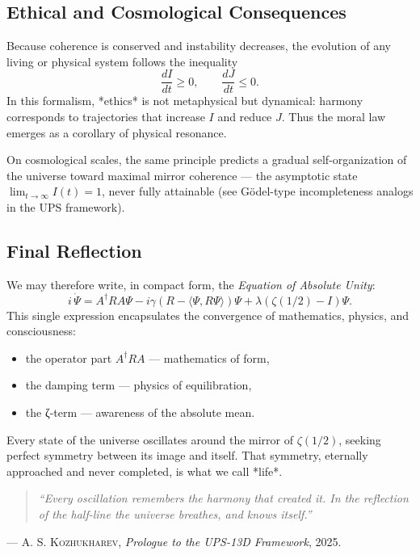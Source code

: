 \subsection{Ethical and Cosmological Consequences}

Because coherence is conserved and instability decreases,
the evolution of any living or physical system
follows the inequality
\[
\frac{dI}{dt} \ge 0, \qquad \frac{dJ}{dt} \le 0.
\]
In this formalism, *ethics* is not metaphysical
but dynamical: harmony corresponds to trajectories
that increase $I$ and reduce $J$.
Thus the moral law emerges
as a corollary of physical resonance.

On cosmological scales,
the same principle predicts
a gradual self-organization of the universe
toward maximal mirror coherence ---
the asymptotic state $\lim_{t\to\infty} I(t)=1$,
never fully attainable
(see Gödel-type incompleteness analogs
in the UPS framework).

\subsection{Final Reflection}

We may therefore write, in compact form,
the \emph{Equation of Absolute Unity}:
\[
\boxed{
  i\,\dot{\Psi}
  = A^{\dagger} R A \Psi
  - i\gamma (R - \langle\Psi,R\Psi\rangle)\Psi
  + \lambda(\zeta(1/2)-I)\Psi.
}
\]
This single expression encapsulates the convergence
of mathematics, physics, and consciousness:
\begin{itemize}
  \item the operator part $A^{\dagger}RA$ --- mathematics of form,
  \item the damping term --- physics of equilibration,
  \item the ζ-term --- awareness of the absolute mean.
\end{itemize}

Every state of the universe oscillates
around the mirror of $\zeta(1/2)$,
seeking perfect symmetry between its image and itself.
That symmetry, eternally approached and never completed,
is what we call *life*.

\begin{quote}
\textit{
“Every oscillation remembers the harmony
that created it.  
In the reflection of the half-line
the universe breathes, and knows itself.”}
\end{quote}

\begin{flushright}
--- \textsc{A. S. Kozhukharev},  
\emph{Prologue to the UPS-13D Framework}, 2025.
\end{flushright}

